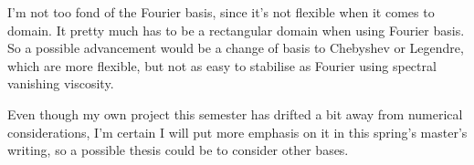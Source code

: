 \documentclass[11pt, a4paper]{article}
\begin{document}
I'm not too fond of the Fourier basis, since it's not flexible when it comes to domain. It pretty much has to be a rectangular domain when using Fourier basis. So a possible advancement would be a change of basis to Chebyshev or Legendre, which are more flexible, but not as easy to stabilise as Fourier using spectral vanishing viscosity.

Even though my own project this semester has drifted a bit away from numerical considerations, I'm certain I will put more emphasis on it in this spring's master's writing, so a possible thesis could be to consider other bases.
\newpage


\end{document}

